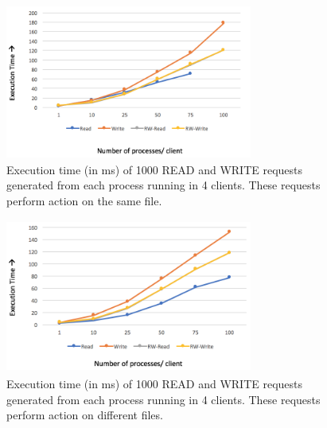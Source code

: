 \begin{figure}
\centering
\includegraphics[height=2in, width=3.2in]{images/F-VHC-SF.png}
\caption{Execution time (in ms) of 1000 READ and WRITE requests generated from each process running in 4 clients. These requests perform action on the same file.}
\end{figure}


\begin{figure}
\centering
\includegraphics[height=2in, width=3.2in]{images/F-VHC-DF.png}
\caption{Execution time (in ms) of 1000 READ and WRITE requests generated from each process running in 4 clients. These requests perform action on different files.}
\end{figure}










